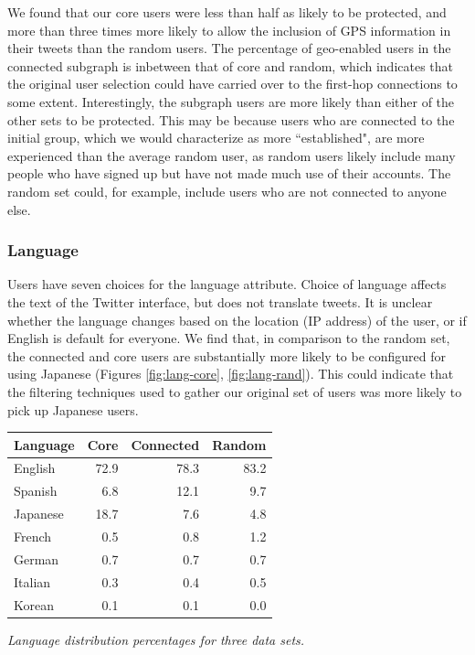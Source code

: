 We found that our core users were less than half as likely to be protected, and more than three times more likely to allow the inclusion of GPS information in their tweets than the random users.  The percentage of geo-enabled users in the connected subgraph is inbetween that of core and random, which indicates that the original user selection could have carried over to the first-hop connections to some extent.  Interestingly, the subgraph users are more likely than either of the other sets to be protected.  This may be because users who are connected to the initial group, which we would characterize as more ``established", are more experienced than the average random user, as random users likely include many people who have signed up but have not made much use of their accounts.  The random set could, for example, include users who are not connected to anyone else.

\subsubsection{Language}

Users have seven choices for the language attribute.  Choice of language affects the text of the Twitter interface, but does not translate tweets.  It is unclear whether the language changes based on the location (IP address) of the user, or if English is default for everyone.  We find that, in comparison to the random set, the connected and core users are substantially more likely to be configured for using Japanese (Figures \ref{fig:lang-core}, \ref{fig:lang-rand}).  This could indicate that the filtering techniques used to gather our original set of users was more likely to pick up Japanese users.

\begin{center}
\begin{tabular}{| l |  r | r | r |}
\hline
\textbf{Language} & \textbf{Core} & \textbf{Connected} & \textbf{Random} \\ \hline
English & 72.9 & 78.3 & 83.2 \\ \hline
Spanish & 6.8 & 12.1 & 9.7 \\ \hline
Japanese & 18.7 & 7.6 & 4.8 \\ \hline
French & 0.5 & 0.8 & 1.2 \\ \hline
German & 0.7 & 0.7 & 0.7 \\ \hline
Italian & 0.3 & 0.4 & 0.5 \\ \hline
Korean & 0.1 &  0.1 & 0.0 \\ \hline
\end{tabular}
\end{center}
\textit{Language distribution percentages for three data sets.}\\

